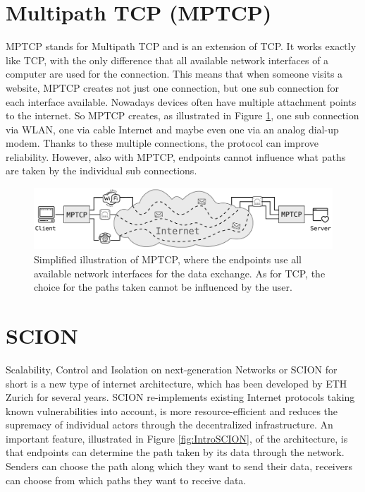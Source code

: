 \section{Multipath TCP (MPTCP)}

MPTCP stands for Multipath TCP and is an extension of TCP. It works exactly like TCP, with the only difference that all available network interfaces of a computer are used for the connection. This means that when someone visits a website, MPTCP creates not just one connection, but one sub connection for each interface available. Nowadays devices often have multiple attachment points to the internet. So MPTCP creates, as illustrated in Figure \ref{fig:IntroMPTCP}, one sub connection via WLAN, one via cable Internet and maybe even one via an analog dial-up modem. Thanks to these multiple connections, the protocol can improve reliability. However, also with MPTCP, endpoints cannot influence what paths are taken by the individual sub connections. 

\begin{figure}[H]
	\begin{center}
		\def\svgwidth{1\textwidth}
		\includegraphics[scale=0.28]{../illustrations/introduction/MPTCPConnection.pdf}    
		\caption[Caption for the list of figures.]{Simplified illustration of MPTCP, where the endpoints use all available network interfaces for the data exchange. As for TCP, the choice for the paths taken cannot be influenced by the user.}
		\label{fig:IntroMPTCP}
	\end{center}
\end{figure}

\section{SCION}

Scalability, Control and Isolation on next-generation Networks or SCION for short is a new type of internet architecture, which has been developed by ETH Zurich for several years. SCION re-implements existing Internet protocols taking known vulnerabilities into account, is more resource-efficient and reduces the supremacy of individual actors through the decentralized infrastructure. An important feature, illustrated in Figure \ref{fig:IntroSCION}, of the architecture, is that endpoints can determine the path taken by its data through the network. Senders can choose the path along which they want to send their data, receivers can choose from which paths they want to receive data.

